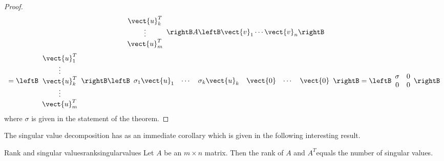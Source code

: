 \begin{proof}
\begin{equation*}
\begin{array}{c}
\vect{u}_{k}^T \\ 
\vdots \\ 
\vect{u}_{m}^T
\end{array}
\rightB A\leftB \vect{v}_{1}\cdots \vect{v}_{n}\rightB
\end{equation*}
\begin{equation*}
=\leftB 
\begin{array}{c}
\vect{u}_{1}^T \\ 
\vdots \\ 
\vect{u}_{k}^T \\ 
\vdots \\ 
\vect{u}_{m}^T
\end{array}
\rightB \leftB 
\begin{array}{cccccc}
\sigma _{1}\vect{u}_{1} & \cdots & \sigma _{k}\vect{u}_{k} & \vect{0}
& \cdots & \vect{0}
\end{array}
\rightB =\leftB 
\begin{array}{cc}
\sigma & 0 \\ 
0 & 0
\end{array}
\rightB
\end{equation*}
where $\sigma $ is given in the statement of the theorem. 
\end{proof}

The singular value decomposition has as an immediate corollary which is given in the following interesting result. 

\begin{corollary}{Rank and singular values}{ranksingularvalues}
Let $A$ be an $m\times n$ matrix. Then the rank of $A$ and $A^T$equals
the number of singular values.
\end{corollary}


